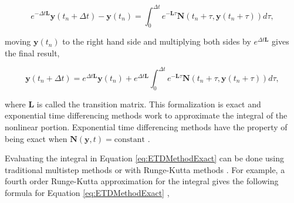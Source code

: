 \begin{equation}
    e^{-\Delta t\boldsymbol{L}}\boldsymbol{y}(t_{n} + \Delta t) - \boldsymbol{y}(t_{n}) = \int_{0}^{\Delta t}e^{-\boldsymbol{L}\tau}\boldsymbol{N}(t_{n} + \tau,\boldsymbol{y}(t_{n} + \tau))d\tau, 
\end{equation}



\noindent moving $\boldsymbol{y}(t_{n})$ to the right hand side and multiplying both sides by $e^{\Delta t \boldsymbol{L}}$ gives the final result,

\begin{equation}
    \boldsymbol{y}(t_{n} + \Delta t) = e^{\Delta t\boldsymbol{L}}\boldsymbol{y}(t_{n}) + e^{\Delta t\boldsymbol{L}}\int_{0}^{\Delta t}e^{-\boldsymbol{L}\tau}\boldsymbol{N}(t_{n} + \tau,\boldsymbol{y}(t_{n} + \tau))d\tau,
    \label{eq:ETDMethodExact}
\end{equation}

\noindent where $\boldsymbol{L}$ is called the transition matrix.
This formalization is exact and exponential time differencing methods work to approximate the integral of the nonlinear portion. Exponential  time  differencing  methods have the property of being exact when $\boldsymbol{N}(\boldsymbol{y},t) = \text{constant}$ \cite{ash2009}.

Evaluating the integral in Equation \ref{eq:ETDMethodExact} can be done using traditional multistep methods or with Runge-Kutta methods \cite{cox2002}. For example, a fourth order Runge-Kutta approximation for the integral gives the following formula for Equation \ref{eq:ETDMethodExact} \cite{cox2002},

